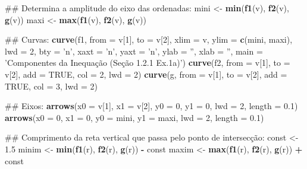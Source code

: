 \documentclass[]{book}
\newenvironment{Shaded}{\begin{snugshade}}{\end{snugshade}}
\newcommand{\KeywordTok}[1]{\textcolor[rgb]{0.13,0.29,0.53}{\textbf{#1}}}
\newcommand{\DataTypeTok}[1]{\textcolor[rgb]{0.13,0.29,0.53}{#1}}
\newcommand{\DecValTok}[1]{\textcolor[rgb]{0.00,0.00,0.81}{#1}}
\newcommand{\FloatTok}[1]{\textcolor[rgb]{0.00,0.00,0.81}{#1}}
\newcommand{\StringTok}[1]{\textcolor[rgb]{0.31,0.60,0.02}{#1}}
\newcommand{\OtherTok}[1]{\textcolor[rgb]{0.56,0.35,0.01}{#1}}
\newcommand{\OperatorTok}[1]{\textcolor[rgb]{0.81,0.36,0.00}{\textbf{#1}}}
\newcommand{\NormalTok}[1]{#1}
\begin{document}
\begin{enumerate}
\begin{Shaded}
\begin{Highlighting}[]
\NormalTok{##  Determina  a amplitude do eixo das ordenadas:}
\NormalTok{mini <-}\StringTok{ }\KeywordTok{min}\NormalTok{(}\KeywordTok{f1}\NormalTok{(v), }\KeywordTok{f2}\NormalTok{(v), }\KeywordTok{g}\NormalTok{(v))}
\NormalTok{maxi <-}\StringTok{ }\KeywordTok{max}\NormalTok{(}\KeywordTok{f1}\NormalTok{(v), }\KeywordTok{f2}\NormalTok{(v), }\KeywordTok{g}\NormalTok{(v))}

\NormalTok{##  Curvas:}
\KeywordTok{curve}\NormalTok{(f1, }\DataTypeTok{from =}\NormalTok{ v[}\DecValTok{1}\NormalTok{], }\DataTypeTok{to =}\NormalTok{ v[}\DecValTok{2}\NormalTok{], }\DataTypeTok{xlim =}\NormalTok{ v, }\DataTypeTok{ylim =} \KeywordTok{c}\NormalTok{(mini, maxi), }\DataTypeTok{lwd =} \DecValTok{2}\NormalTok{,}
  \DataTypeTok{bty =} \StringTok{'n'}\NormalTok{, }\DataTypeTok{xaxt =} \StringTok{'n'}\NormalTok{, }\DataTypeTok{yaxt =} \StringTok{'n'}\NormalTok{, }\DataTypeTok{ylab =} \StringTok{''}\NormalTok{, }\DataTypeTok{xlab =} \StringTok{''}\NormalTok{,}
  \DataTypeTok{main =} \StringTok{'Componentes da Inequação (Seção 1.2.1 Ex.1a)'}\NormalTok{)}
\KeywordTok{curve}\NormalTok{(f2, }\DataTypeTok{from =}\NormalTok{ v[}\DecValTok{1}\NormalTok{], }\DataTypeTok{to =}\NormalTok{ v[}\DecValTok{2}\NormalTok{], }\DataTypeTok{add =} \OtherTok{TRUE}\NormalTok{, }\DataTypeTok{col =} \DecValTok{2}\NormalTok{, }\DataTypeTok{lwd =} \DecValTok{2}\NormalTok{)}
\KeywordTok{curve}\NormalTok{(g, }\DataTypeTok{from =}\NormalTok{ v[}\DecValTok{1}\NormalTok{], }\DataTypeTok{to =}\NormalTok{ v[}\DecValTok{2}\NormalTok{], }\DataTypeTok{add =} \OtherTok{TRUE}\NormalTok{, }\DataTypeTok{col =} \DecValTok{3}\NormalTok{, }\DataTypeTok{lwd =} \DecValTok{2}\NormalTok{)}

\NormalTok{##  Eixos:}
\KeywordTok{arrows}\NormalTok{(}\DataTypeTok{x0 =}\NormalTok{ v[}\DecValTok{1}\NormalTok{], }\DataTypeTok{x1 =}\NormalTok{ v[}\DecValTok{2}\NormalTok{],}
   \DataTypeTok{y0 =} \DecValTok{0}\NormalTok{, }\DataTypeTok{y1 =} \DecValTok{0}\NormalTok{, }\DataTypeTok{lwd =} \DecValTok{2}\NormalTok{, }\DataTypeTok{length =} \FloatTok{0.1}\NormalTok{)}
\KeywordTok{arrows}\NormalTok{(}\DataTypeTok{x0 =} \DecValTok{0}\NormalTok{, }\DataTypeTok{x1 =} \DecValTok{0}\NormalTok{,}
   \DataTypeTok{y0 =}\NormalTok{ mini, }\DataTypeTok{y1 =}\NormalTok{ maxi, }\DataTypeTok{lwd =} \DecValTok{2}\NormalTok{, }\DataTypeTok{length =} \FloatTok{0.1}\NormalTok{)}

\NormalTok{##  Comprimento da reta vertical que passa pelo ponto de intersecção:}
\NormalTok{const <-}\StringTok{ }\FloatTok{1.5}
\NormalTok{minim <-}\StringTok{ }\KeywordTok{min}\NormalTok{(}\KeywordTok{f1}\NormalTok{(r), }\KeywordTok{f2}\NormalTok{(r), }\KeywordTok{g}\NormalTok{(r)) }\OperatorTok{-}\StringTok{ }\NormalTok{const}
\NormalTok{maxim <-}\StringTok{ }\KeywordTok{max}\NormalTok{(}\KeywordTok{f1}\NormalTok{(r), }\KeywordTok{f2}\NormalTok{(r), }\KeywordTok{g}\NormalTok{(r)) }\OperatorTok{+}\StringTok{ }\NormalTok{const}


\end{Highlighting}
\end{Shaded}
\end{enumerate}
\end{document}
